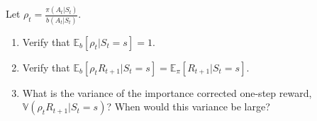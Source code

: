 Let $\rho_{t} = \frac{\pi(A_{t} | S_{t})}{b(A_{t} | S_{t})}$.
\begin{enumerate}
    \item Verify that $\mathbb{E}_{b}[\rho_{t} | S_t=s] = 1$.
    \item Verify that $\mathbb{E}_{b}[\rho_{t} R_{t+1} | S_t = s] = \mathbb{E}_{\pi}[R_{t+1} | S_t = s]$.
    \item What is the variance of the importance corrected one-step reward, $\mathbb{V}(\rho_{t} R_{t+1} | S_t =s)$? When would this variance be large?
\end{enumerate}